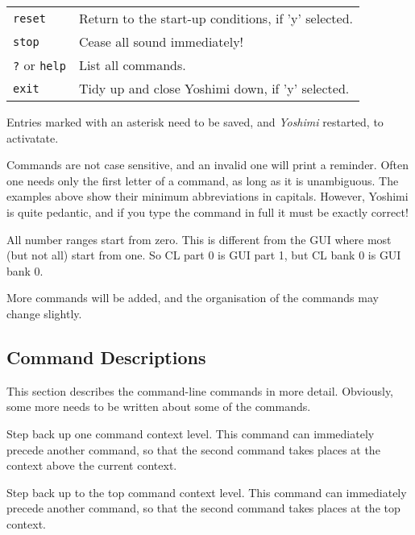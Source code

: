 \begin{table}[H]
\begin{tabular}{l l}
         \texttt{reset} &
            Return to the start-up conditions, if 'y' selected. \\

         \texttt{stop} &
            Cease all sound immediately! \\

         \texttt{?} or \texttt{help} &
            List all commands. \\

         \texttt{exit} &
            Tidy up and close Yoshimi down, if 'y' selected. \\

      \end{tabular}
   \end{table}

   Entries marked with an asterisk need to be saved, and \textsl{Yoshimi}
   restarted, to activatate.

   Commands are not case sensitive, and an invalid one will print a reminder.
   Often one needs only the first letter of a command, as long as it is
   unambiguous. The examples above show their minimum abbreviations in capitals.
   However, Yoshimi is quite pedantic, and if you type the command in full it
   must be exactly correct!

   All number ranges start from zero. This is different from the GUI where most
   (but not all) start from one. So CL part 0 is GUI part 1, but CL bank 0 is
   GUI bank 0.

   More commands will be added, and the organisation of the commands
   may change slightly.

\subsection{Command Descriptions}
\label{subsec:command_line_command_descriptions}

   This section describes the command-line commands in more detail.
   Obviously, some more needs to be written about some of the commands.

   \setcounter{ItemCounter}{0}      %

      Step back up one command context level.
      This command can immediately precede another command, so that the second
      command takes places at the context above the current context.

      Step back up to the top command context level.
      This command can immediately precede another command, so that the second
      command takes places at the top context.

